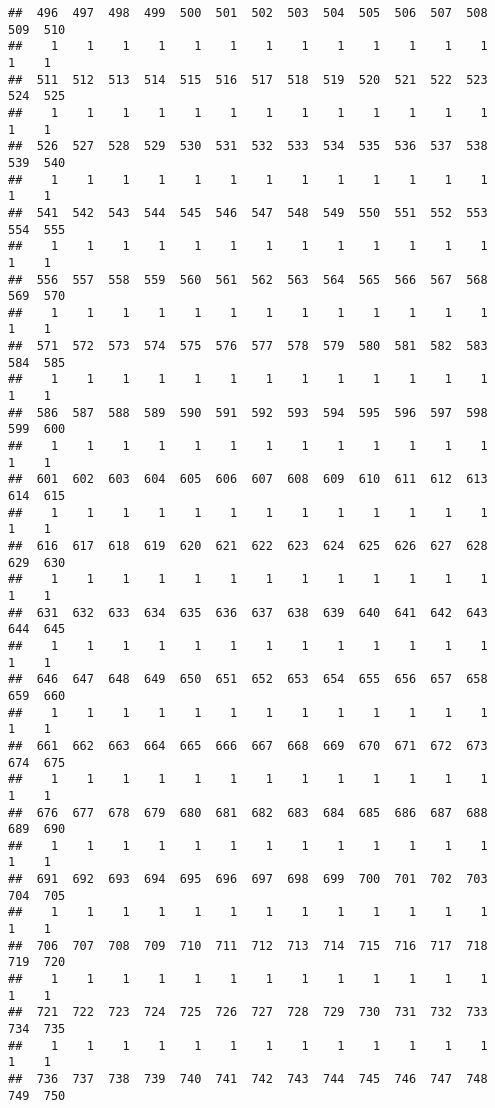 \documentclass[]{article}
\begin{document}
\begin{verbatim}
##  496  497  498  499  500  501  502  503  504  505  506  507  508  509  510 
##    1    1    1    1    1    1    1    1    1    1    1    1    1    1    1 
##  511  512  513  514  515  516  517  518  519  520  521  522  523  524  525 
##    1    1    1    1    1    1    1    1    1    1    1    1    1    1    1 
##  526  527  528  529  530  531  532  533  534  535  536  537  538  539  540 
##    1    1    1    1    1    1    1    1    1    1    1    1    1    1    1 
##  541  542  543  544  545  546  547  548  549  550  551  552  553  554  555 
##    1    1    1    1    1    1    1    1    1    1    1    1    1    1    1 
##  556  557  558  559  560  561  562  563  564  565  566  567  568  569  570 
##    1    1    1    1    1    1    1    1    1    1    1    1    1    1    1 
##  571  572  573  574  575  576  577  578  579  580  581  582  583  584  585 
##    1    1    1    1    1    1    1    1    1    1    1    1    1    1    1 
##  586  587  588  589  590  591  592  593  594  595  596  597  598  599  600 
##    1    1    1    1    1    1    1    1    1    1    1    1    1    1    1 
##  601  602  603  604  605  606  607  608  609  610  611  612  613  614  615 
##    1    1    1    1    1    1    1    1    1    1    1    1    1    1    1 
##  616  617  618  619  620  621  622  623  624  625  626  627  628  629  630 
##    1    1    1    1    1    1    1    1    1    1    1    1    1    1    1 
##  631  632  633  634  635  636  637  638  639  640  641  642  643  644  645 
##    1    1    1    1    1    1    1    1    1    1    1    1    1    1    1 
##  646  647  648  649  650  651  652  653  654  655  656  657  658  659  660 
##    1    1    1    1    1    1    1    1    1    1    1    1    1    1    1 
##  661  662  663  664  665  666  667  668  669  670  671  672  673  674  675 
##    1    1    1    1    1    1    1    1    1    1    1    1    1    1    1 
##  676  677  678  679  680  681  682  683  684  685  686  687  688  689  690 
##    1    1    1    1    1    1    1    1    1    1    1    1    1    1    1 
##  691  692  693  694  695  696  697  698  699  700  701  702  703  704  705 
##    1    1    1    1    1    1    1    1    1    1    1    1    1    1    1 
##  706  707  708  709  710  711  712  713  714  715  716  717  718  719  720 
##    1    1    1    1    1    1    1    1    1    1    1    1    1    1    1 
##  721  722  723  724  725  726  727  728  729  730  731  732  733  734  735 
##    1    1    1    1    1    1    1    1    1    1    1    1    1    1    1 
##  736  737  738  739  740  741  742  743  744  745  746  747  748  749  750 

\end{verbatim}
\end{document}
